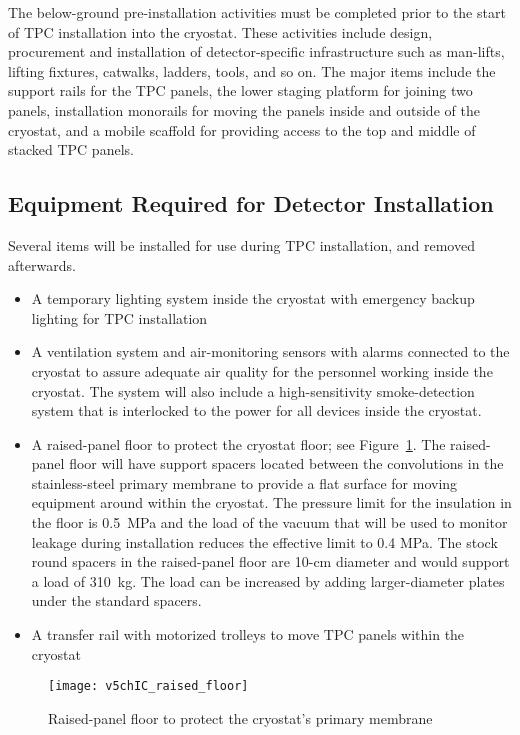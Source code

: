 The below-ground pre-installation activities  
must be completed prior to the start of TPC installation into the cryostat. These activities include design, procurement and installation of detector-specific infrastructure such as man-lifts, lifting fixtures, catwalks, ladders, tools, and so on. The major items include the support rails for the TPC panels, the lower staging platform for joining two panels, installation monorails for moving the panels inside and outside of the cryostat, and a mobile scaffold for providing access to the top and middle of stacked  
TPC panels.

\subsection{Equipment Required for Detector Installation}

Several items will be installed for use during TPC installation, and removed afterwards.
\begin{itemize}
\item A temporary lighting system inside the cryostat with emergency backup lighting for TPC installation
\item A ventilation system and air-monitoring sensors with alarms connected to the cryostat to assure adequate air quality for the personnel working inside the cryostat. The system will also include a high-sensitivity smoke-detection system that is interlocked to the power for all devices inside the cryostat. 
\item A raised-panel floor to protect the cryostat floor; see Figure~\ref{fig:raised_floor}. The raised-panel floor will have support spacers located between the convolutions in the stainless-steel primary membrane to provide  a flat surface for moving equipment around within the cryostat. The pressure limit for the insulation in the floor is 0.5~MPa and the load of the vacuum that will be used to monitor 
leakage during installation reduces the effective limit to 0.4 MPa.  The stock round spacers in the raised-panel floor are 10-cm diameter and would support a load of  310~kg. The load can be increased by adding larger-diameter plates under the standard spacers.
\item A transfer rail with motorized trolleys to move TPC 
panels within the cryostat
\end{itemize}

\begin{figure}[htbp]
\centering
\texttt{[image: v5chIC\_raised\_floor]}
\caption{Raised-panel floor to protect the cryostat's primary membrane }
\label{fig:raised_floor}
\end{figure}

